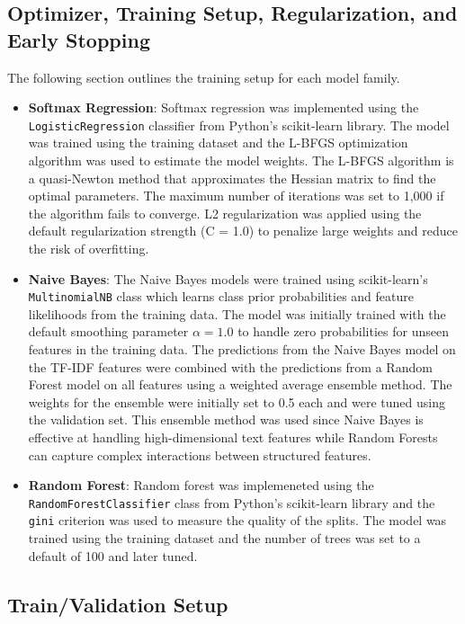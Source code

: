 \documentclass[12pt]{article}
\begin{document}
\subsection*{Optimizer, Training Setup, Regularization, and Early Stopping} 
The following section outlines the training setup for each model family.
\begin{itemize} 
    \item \textbf{Softmax Regression}: Softmax regression was implemented using the \texttt{LogisticRegression} classifier from Python's scikit-learn library. The model was trained using the training dataset and the L-BFGS optimization algorithm was used to estimate the model weights. The L-BFGS algorithm is a quasi-Newton method that approximates the Hessian matrix to find the optimal parameters. The maximum number of iterations was set to 1,000 if the algorithm fails to converge. L2 regularization was applied using the default regularization strength (C = 1.0) to penalize large weights and reduce the risk of overfitting.
    \item \textbf{Naive Bayes}: The Naive Bayes models were trained using scikit-learn's \texttt{MultinomialNB} class which learns class prior probabilities and feature likelihoods from the training data. The model was initially trained with the default smoothing parameter $\alpha = 1.0$ to handle zero probabilities for unseen features in the training data. The predictions from the Naive Bayes model on the TF-IDF features were combined with the predictions from a Random Forest model on all features using a weighted average ensemble method. The weights for the ensemble were initially set to 0.5 each and were tuned using the validation set. This ensemble method was used since Naive Bayes is effective at handling high-dimensional text features while Random Forests can capture complex interactions between structured features.
    \item \textbf{Random Forest}: Random forest was implemeneted using the \texttt{RandomForestClassifier} class from Python's scikit-learn library and the \texttt{gini} criterion was used to measure the quality of the splits. The model was trained using the training dataset and the number of trees was set to a default of 100 and later tuned. 
\end{itemize}

\subsection*{Train/Validation Setup} 
\end{document}
